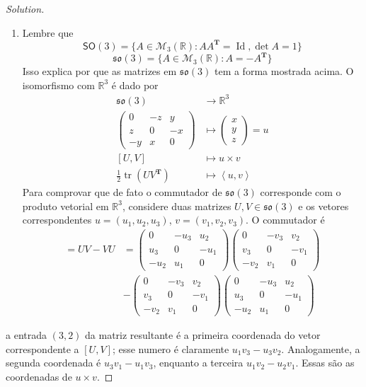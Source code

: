 \begin{proof}[Solution]\leavevmode
	\begin{enumerate}[label=\alph*.]
		\item Lembre que
			\[\mathsf{SO}(3) =\{A\in\mathcal{M}_{3}(\mathbb{R}):A A^{\mathbf{T}}=\operatorname{Id},\det A=1\}\]
			\[\mathfrak{so}(3) =\{A\in\mathcal{M}_{3}(\mathbb{R}):A=-A^{\mathbf{T}}\}\]
Isso explica por que as matrizes em $\mathfrak{so}(3)$ tem a forma mostrada acima. O isomorfismo com $\mathbb{R}^{3}$ é dado por
	\begin{align*}
		 \mathfrak{so}(3) &\longrightarrow \mathbb{R}^{3} \\
		\begin{pmatrix} 0&-z&y\\z&0&-x\\-y&x&0 \end{pmatrix}  &\longmapsto \begin{pmatrix} x\\y\\z \end{pmatrix} =u\\
		[U,V ]& \longmapsto u\times v\\
		\frac{1}{2}\operatorname{tr}(UV^{\mathbf{T}})&\longmapsto\left<u,v\right> 
	\end{align*}
Para comprovar que de fato o commutador de $\mathfrak{so}(3)$ corresponde com o produto vetorial em $\mathbb{R}^{3}$, considere duas matrizes $U,V\in\mathfrak{so}(3)$ e os vetores correspondentes $u=(u_1,u_2,u_3)$, $v=(v_1,v_2,v_3)$. O commutador é
\begin{align*}
	[U,V]=UV-VU&=\begin{pmatrix} 0&-u_3&u_2\\u_3&0&-u_1\\-u_2&u_1&0 \end{pmatrix} \begin{pmatrix} 0&-v_3&v_2\\v_3&0&-v_1\\-v_2&v_1&0 \end{pmatrix} \\
	&- \begin{pmatrix} 0&-v_3&v_2\\v_3&0&-v_1\\-v_2&v_1&0 \end{pmatrix} 
\begin{pmatrix} 0&-u_3&u_2\\u_3&0&-u_1\\-u_2&u_1&0 \end{pmatrix}\end{align*}
	\end{enumerate}
	a entrada $(3,2)$ da matriz resultante  é a primeira coordenada do vetor correspondente a $[U,V]$; esse numero é claramente $u_1v_3-u_3v_2$. Analogamente, a segunda coordenada é $u_3v_1-u_1v_3$, enquanto a terceira $u_1v_2-u_2v_1$. Essas são as coordenadas de $u\times v$.


\end{proof}
